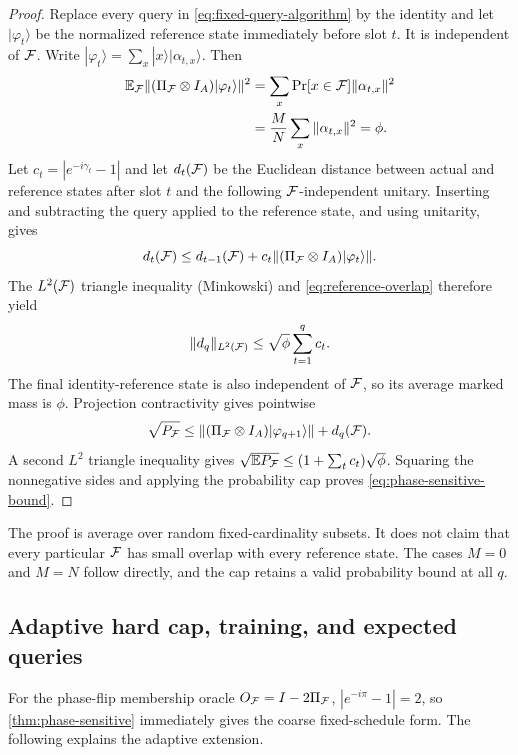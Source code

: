 \begin{proof}
Replace every query in \cref{eq:fixed-query-algorithm} by the identity and let
$|\varphi_t\rangle$ be the normalized reference state immediately before
slot $t$. It is independent of $\mathcal{F}$. Write
$|\varphi_t\rangle=\sum_x|x\rangle|\alpha_{t,x}\rangle$. Then
\begin{align}
 \mathbb{E}_{\mathcal{F}}\| (\Pi_{\mathcal{F}}\otimes I_A)|\varphi_t\rangle\|^2
 &=\sum_x\Pr[x\in\mathcal{F}]\|\alpha_{t,x}\|^2\\
 &=\frac{M}{N}\sum_x\|\alpha_{t,x}\|^2=\phi.
 \label{eq:reference-overlap}
\end{align}
Let $c_t=|e^{-i\gamma_t}-1|$ and let $d_t(\mathcal{F})$ be the Euclidean distance
between actual and reference states after slot $t$ and the following
$\mathcal{F}$-independent unitary. Inserting and subtracting the query applied to the
reference state, and using unitarity, gives
\begin{equation}
 d_t(\mathcal{F})\leq d_{t-1}(\mathcal{F})
  +c_t\|(\Pi_{\mathcal{F}}\otimes I_A)|\varphi_t\rangle\|.
\end{equation}
The $L^2(\mathcal{F})$ triangle inequality (Minkowski) and
\cref{eq:reference-overlap} therefore yield
\begin{equation}
  \|d_q\|_{L^2(\mathcal{F})}\leq\sqrt{\phi}\sum_{t=1}^{q}c_t.
\end{equation}
The final identity-reference state is also independent of $\mathcal{F}$, so its
average marked mass is $\phi$. Projection contractivity gives pointwise
\begin{equation}
 \sqrt{P_{\mathcal{F}}}
 \leq\|(\Pi_{\mathcal{F}}\otimes I_A)|\varphi_{q+1}\rangle\|+d_q(\mathcal{F}).
\end{equation}
A second $L^2$ triangle inequality gives
$\sqrt{\mathbb{E} P_{\mathcal{F}}}\leq(1+\sum_t c_t)\sqrt\phi$. Squaring the nonnegative sides
and applying the probability cap proves \cref{eq:phase-sensitive-bound}.
\end{proof}

The proof is average over random fixed-cardinality subsets. It does not claim
that every particular $\mathcal{F}$ has small overlap with every reference state.
The cases $M=0$ and $M=N$ follow directly, and the cap retains a valid
probability bound at all $q$.

\subsection{Adaptive hard cap, training, and expected queries}

For the phase-flip membership oracle $O_{\mathcal{F}}=I-2\Pi_{\mathcal{F}}$,
$|e^{-i\pi}-1|=2$, so \cref{thm:phase-sensitive} immediately gives the
coarse fixed-schedule form. The following explains the adaptive extension.

